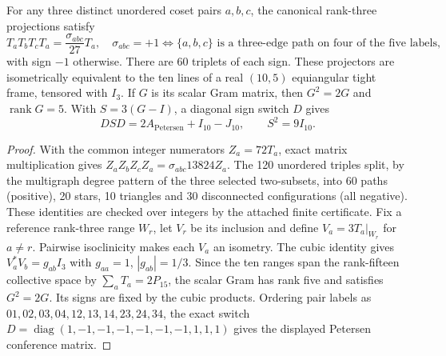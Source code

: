 \documentclass[11pt]{article}
\begin{document}
\begin{theorem}
\label{p1b:thm:petersen-cubic-conference}
For any three distinct unordered coset pairs $a,b,c$, the
canonical rank-three projections satisfy
\[
T_aT_bT_cT_a=\frac{\sigma_{abc}}{27}T_a,
\quad\sigma_{abc}=+1
\iff\{a,b,c\}\text{ is a three-edge path on four of the five labels},
\]
with sign $-1$ otherwise. There are 60 triplets of each sign.
These projectors are isometrically equivalent to the ten lines
of a real $(10,5)$ equiangular tight frame, tensored with $I_3$.
If $G$ is its scalar Gram matrix, then $G^2=2G$ and $\operatorname{rank}G=5$.
With $S=3(G-I)$, a diagonal sign switch $D$ gives
\[
DSD=2A_{\mathrm{Petersen}}+I_{10}-J_{10},\qquad S^2=9I_{10}.
\]
\end{theorem}
\begin{proof}
With the common integer numerators $Z_a=72T_a$, exact matrix
multiplication gives $Z_aZ_bZ_cZ_a=\sigma_{abc}13824Z_a$.
The 120 unordered triples split, by the multigraph degree pattern
of the three selected two-subsets, into 60 paths (positive),
20 stars, 10 triangles and 30 disconnected configurations
(all negative). These identities are checked over integers by the
attached finite certificate. Fix a reference rank-three range
$W_r$, let $V_r$ be its inclusion and define
$V_a=3T_a|_{W_r}$ for $a\ne r$. Pairwise isoclinicity makes
each $V_a$ an isometry. The cubic identity gives
$V_a^*V_b=g_{ab}I_3$ with $g_{aa}=1$, $|g_{ab}|=1/3$.
Since the ten ranges span the rank-fifteen collective space by
$\sum_aT_a=2P_{15}$, the scalar Gram has rank five and
satisfies $G^2=2G$. Its signs are fixed by the cubic products.
Ordering pair labels as $01,02,03,04,12,13,14,23,24,34$,
the exact switch
$D=\operatorname{diag}(1,-1,-1,-1,-1,-1,-1,1,1,1)$
gives the displayed Petersen conference matrix.
\end{proof}
\end{document}
